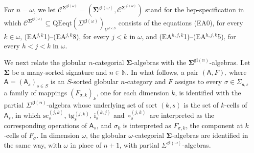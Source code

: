 \documentclass[a4paper, reqno
]{amsart}
\newcommand{\sig}[1]{\mathbf{#1}}             %
\newcommand{\spec}[1]{\boldsymbol{\mathcal{#1}}} %
\newcommand{\gl}{\mathrm{gl}}                %
\newcommand{\src}{\mathrm{sc}}
\newcommand{\tgt}{\mathrm{tg}}
\theoremstyle{plain}
\theoremstyle{definition}
\begin{document}
For $n=\omega$, we let $\spec{C}^{\sig{\Sigma}^{\gl(\omega)}}=(\sig{\Sigma}^{\gl(\omega)},\mathcal{C}^{\sig{\Sigma}^{\gl(\omega)}})$ stand for the hep-specification in which $\mathcal{C}^{\sig{\Sigma}^{\gl(\omega)}}\subseteq\mathrm{QEeqt}(\Sigma^{\gl(\omega)})_{V^{\omega\times S}}$ consists of the equations (EA0), for every $k\in\omega$, (EA$^{j,k}$1)--(EA$^{j,k}$8), for every $j<k$ in $\omega$, and (EA$^{h,j,k}$1)--(EA$^{h,j,k}$5), for every $h<j<k$ in $\omega$.

We next relate the globular $n$-categorial $\sig{\Sigma}$-algebras with the $\sig{\Sigma}^{\gl(n)}$-algebras.
Let $\sig{\Sigma}$ be a many-sorted signature and $n\in\mathbb{N}$.
In what follows, a pair $(\mathsf{A},F)$, where $\mathsf{A}=(\mathsf{A}_{s})_{s\in S}$ is an $S$-sorted globular $n$-category and $F$ assigns to every $\sigma\in\Sigma_{\mathbf{s},s}$ a family of mappings $(F_{\sigma,k})_{k}$, one for each dimension $k$, is identified with the partial $\Sigma^{\gl(n)}$-algebra whose underlying set of sort $(k,s)$ is the set of $k$-cells of $\mathsf{A}_{s}$, in which $\src^{(j,k)}_{s}$, $\tgt^{(j,k)}_{s}$, $\mathrm{i}^{(k,j)}_{s}$ and $\circ^{(j,k)}_{s}$ are interpreted as the corresponding operations of $\mathsf{A}_{s}$, and $\sigma_{k}$ is interpreted as $F_{\sigma,k}$, the component at $k$-cells of $F_{\sigma}$.
In dimension $\omega$, the globular $\omega$-categorial $\sig{\Sigma}$-algebras are identified in the same way, with $\omega$ in place of $n+1$, with partial $\Sigma^{\gl(\omega)}$-algebras.
\end{document}
